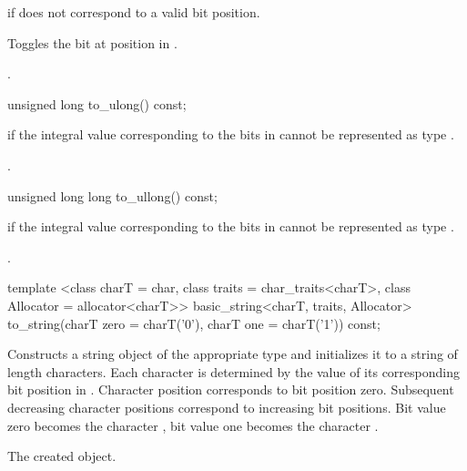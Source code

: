 \begin{itemdescr}
\pnum
\throws
{}
if  does not correspond to a valid bit position.%

\pnum
\effects
Toggles the bit at position  in
.

\pnum
\returns
{}.
\end{itemdescr}

%
\begin{itemdecl}
unsigned long to_ulong() const;
\end{itemdecl}

\begin{itemdescr}
\pnum
\throws
{}%
if the integral value  corresponding to the bits in
cannot be represented as type
.

\pnum
\returns
{}.
\end{itemdescr}

%
\begin{itemdecl}
unsigned long long to_ullong() const;
\end{itemdecl}

\begin{itemdescr}
\pnum
{}%
\throws
{}
if the integral value  corresponding to the bits in
cannot be represented as type
.

\pnum
\returns
{}.
\end{itemdescr}

%
\begin{itemdecl}
template <class charT = char,
    class traits = char_traits<charT>,
    class Allocator = allocator<charT>>
  basic_string<charT, traits, Allocator>
  to_string(charT zero = charT('0'), charT one = charT('1')) const;
\end{itemdecl}

\begin{itemdescr}
\pnum
\effects
Constructs a string object of the appropriate type
and initializes it to a string of length  characters.
Each character is determined by the value of its corresponding bit position in
.
Character position  corresponds to bit position zero.
Subsequent decreasing character positions correspond to increasing bit
positions.
Bit value zero becomes the character ,
bit value one becomes the character
.

\pnum
\returns
The created object.
\end{itemdescr}

